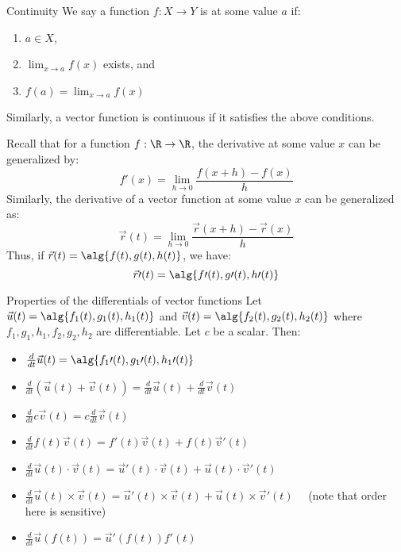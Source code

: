 \documentclass[math]{amznotes}
\begin{document}
\begin{dfnbox}{Continuity}{}
    We say a function $f : X \to Y$ is  at some value $a$ if:
    \begin{enumerate}[noitemsep]
        \item $a \in X$,
        \item $\lim_{x \to a} f(x)$ exists, and
        \item $f(a) = \lim_{x \to a} f(x)$
    \end{enumerate}
\end{dfnbox}

Similarly, a vector function is continuous if it satisfies the above conditions.

Recall that for a function $f : \R \to \R$, the derivative at some value $x$ can be generalized by:
\[ f\prime(x) = \lim_{h \to 0} \frac{f(x + h) - f(x)}{h} \]
Similarly, the derivative of a vector function at some value $x$ can be generalized as:
\[ \vec{r}(t) = \lim_{h \to 0} \frac{\vec{r}(x+h) - \vec{r}(x)}{h} \]
Thus, if $\vec{r}(t) = \alg{f(t), g(t), h(t)}$, we have:
\[ \vec{r}\prime(t) = \alg{f\prime(t), g\prime(t), h\prime(t)} \]

\begin{thmbox}{Properties of the differentials of vector functions}{}
    Let $\vec{u}(t) = \alg{f_1(t), g_1(t), h_1(t)}$ and $\vec{v}(t) = \alg{f_2(t), g_2(t), h_2(t) }$ where $f_1, g_1, h_1, f_2, g_2, h_2$ are differentiable. Let $c$ be a scalar. Then:
    \begin{itemize}
        \item $\frac{d}{dt} \vec{u}(t) = \alg{f_1\prime(t), g_1\prime(t), h_1\prime(t)}$
        \item $\frac{d}{dt} \left( \vec{u}(t) + \vec{v}(t) \right) = \frac{d}{dt} \vec{u}(t) + \frac{d}{dt} \vec{v}(t)$
        \item $\frac{d}{dt} c \vec{v}(t) = c \frac{d}{dt} \vec{v}(t)$
        \item $\frac{d}{dt} f(t) \vec{v}(t) = f\prime(t) \vec{v}(t) + f(t) \vec{v}\prime(t)$
        \item $\frac{d}{dt} \vec{u}(t) \cdot \vec{v}(t) = \vec{u}\prime(t) \cdot \vec{v}(t) + \vec{u}(t) \cdot \vec{v}\prime(t)$
        \item $\frac{d}{dt} \vec{u}(t) \times \vec{v}(t) = \vec{u}\prime(t) \times \vec{v}(t) + \vec{u}(t) \times \vec{v}\prime(t) \quad$ (note that order here is sensitive)
        \item $\frac{d}{dt} \vec{u}(f(t)) = \vec{u}\prime(f(t)) f\prime(t)$
    \end{itemize}
\end{thmbox}
\end{document}
